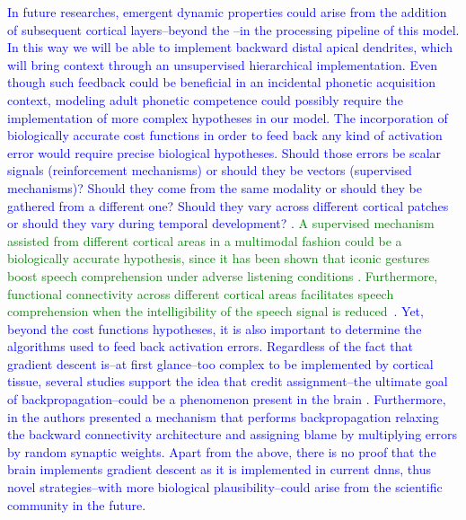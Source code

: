 \documentclass[10pt,letterpaper]{article}
\begin{document}
\textcolor{blue}{In future researches, emergent dynamic properties could arise from the addition of subsequent cortical layers--beyond the --in the processing pipeline of this model.  In this way we will be able to implement backward distal apical dendrites, which will bring context through an unsupervised hierarchical implementation. Even though such feedback could be beneficial in an incidental phonetic acquisition context, modeling adult phonetic competence could possibly require the implementation of more complex hypotheses in our model. The incorporation of biologically accurate cost functions in order to feed back any kind of activation error would require precise biological hypotheses. Should those errors be scalar signals (reinforcement mechanisms) or should they be vectors (supervised mechanisms)? Should they come from the same modality or should they be gathered from a different one? Should they vary across different cortical patches or should they vary during temporal development? \cite{10.3389/fncom.2016.00094}. \textcolor{green}{A supervised mechanism assisted from different cortical areas in a multimodal fashion could be a biologically accurate hypothesis, since it has been shown that iconic gestures boost speech comprehension under adverse listening conditions \cite{HOLLE2010875}. Furthermore, functional connectivity across different cortical areas facilitates speech comprehension when the intelligibility of the speech signal is reduced~\cite{Obleser2283}}. Yet, beyond the cost functions hypotheses, it is also important to determine the algorithms used to feed back activation errors. Regardless of the fact that gradient descent is--at first glance--too complex to be implemented by cortical tissue, several studies support the idea that credit assignment--the ultimate goal of backpropagation--could be a phenomenon present in the brain \cite{Guerguiev2017TowardsDL}. Furthermore, in \cite{Lillicrap_2016} the authors presented a mechanism that performs backpropagation relaxing the backward connectivity architecture and assigning blame by multiplying errors by random synaptic weights. Apart from the above, there is no proof that the brain implements gradient descent as it is implemented in current \glspl{dnn}, thus novel strategies--with more biological plausibility--could arise from the scientific community in the future}.
\end{document}
